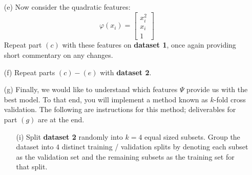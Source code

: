 \documentclass{article}
\begin{document}
\begin{itemize}
            \item [(e)] Now consider the quadratic features:
                \begin{equation*}
                    \varphi(x_{i}) = \begin{bmatrix}
                        x_{i}^{2} \\
                        x_{i}     \\
                        1           
                    \end{bmatrix}
                \end{equation*}
            Repeat part $(c)$ with these features on \textbf{dataset 1}, once again providing short commentary on any changes.

            \item [(f)] Repeat parts $(c) - (e)$ with \textbf{dataset 2}.

            \item [(g)] Finally, we would like to understand which features $\Psi$ provide us with the best model. To that end, you will implement a method known as $k$-fold cross validation. The following are instructions for this method; deliverables for part $(g)$ are at the end.
                \begin{itemize}
                    \item [(i)] Split \textbf{dataset 2} randomly into $k = 4$ equal sized subsets. Group the dataset into $4$ distinct training / validation splits by denoting each subset as the validation set and the remaining subsets as the training set for that split.


\end{itemize}
\end{itemize}
\end{document}
